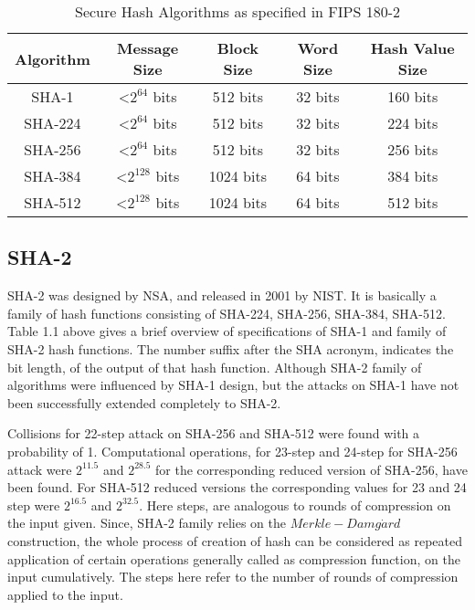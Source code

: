   \begin{table}[h]
    \begin{center}
    \begin{tabular}{ *{5}{c} }
      \hline
      Algorithm & Message Size & Block Size & Word Size & Hash Value Size \\ \hline \hline
      SHA-1   & \textless $2^{64}$  bits & 512  bits & 32 bits & 160 bits \\   
      SHA-224 & \textless $2^{64}$  bits & 512  bits & 32 bits & 224 bits \\   
      SHA-256 & \textless $2^{64}$  bits & 512  bits & 32 bits & 256 bits \\   
      SHA-384 & \textless $2^{128}$ bits & 1024 bits & 64 bits & 384 bits \\   
      SHA-512 & \textless $2^{128}$ bits & 1024 bits & 64 bits & 512 bits \\
      \hline
    \end{tabular}
    \caption{ Secure Hash Algorithms as specified in FIPS 180-2} 
  \end{center}
  \end{table}

  \subsection{SHA-2}

  SHA-2 was designed by NSA, and released in 2001 by NIST. It is basically a family of hash functions 
  consisting of SHA-224, SHA-256, SHA-384, SHA-512. Table 1.1 above gives a brief overview of specifications
  of SHA-1 and family of SHA-2 hash functions. The number suffix after the SHA acronym, 
  indicates the bit length, of the output of that hash function. Although SHA-2 family of algorithms
  were influenced by SHA-1 design, but the attacks on SHA-1 have not been successfully extended completely
  to SHA-2.

  Collisions for 22-step attack on SHA-256 and SHA-512 were found with a probability of 1. Computational
  operations, for 23-step and 24-step for SHA-256 attack were $2^{11.5}$ and $2^{28.5}$ for the corresponding
  reduced version of SHA-256, have been found. For SHA-512 reduced versions the corresponding values for
  23 and 24 step were $2^{16.5}$ and $2^{32.5}$.\cite{00012} Here steps, are analogous to rounds of compression
  on the input given. Since, SHA-2 family relies on the $Merkle-Damg\dot{a}rd$ construction, the whole
  process of creation of hash can be considered as repeated application of certain operations generally called
  as compression function, on the input cumulatively. The steps here refer to the number of rounds of
  compression applied to the input.


